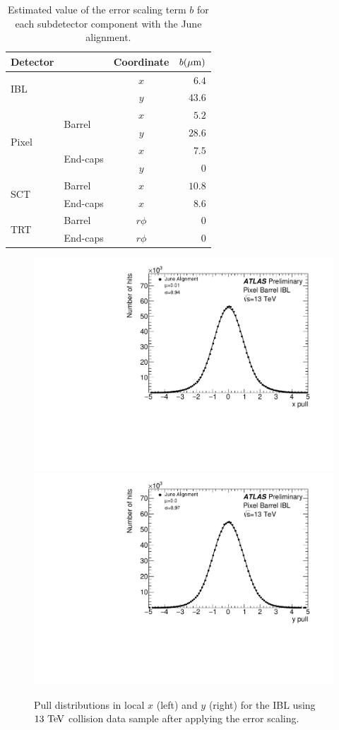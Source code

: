 \begin{table}[htbp]
  \centering
  \begin{tabular}{l l c r}
  Detector & & Coordinate & $b (\mu\textrm{m})$ \\
  \hline\hline
  \multirow{2}{*}{IBL} & & $x$ & $6.4$ \\
                       & & $y$ & $43.6$ \\
  \hline
  \multirow{4}{*}{Pixel} & \multirow{2}{*}{Barrel} & $x$ & $5.2$ \\
                         &                         & $y$ & $28.6$ \\
                         \cline{2-4}
                         & \multirow{2}{*}{End-caps} & $x$ & $7.5$ \\
                         &                         & $y$ & $0$ \\
  \hline
  \multirow{2}{*}{SCT} & Barrel&   $x$ & $10.8$ \\
                       & End-caps& $x$ & $8.6$ \\
  \hline
  \multirow{2}{*}{TRT} & Barrel&   $r\phi$ & $0$ \\
                       & End-caps& $r\phi$ & $0$ \\
  \hline
  \end{tabular}
  \caption{Estimated value of the error scaling term $b$ for each subdetector component with the June alignment.}
  \label{tab:align_error_scaling}
\end{table}

\begin{figure}[htbp]
  \centering
  \includegraphics[width=.48\textwidth]{figs/alignment/align2015/PIXPULLX0}
  \includegraphics[width=.48\textwidth]{figs/alignment/align2015/PIXPULLY0}
  \caption{Pull distributions in local $x$ (left) and $y$ (right) for the IBL using $13\tev$ collision data sample after applying the error scaling.}
  \label{fig:align_pull_ibl}
\end{figure}

